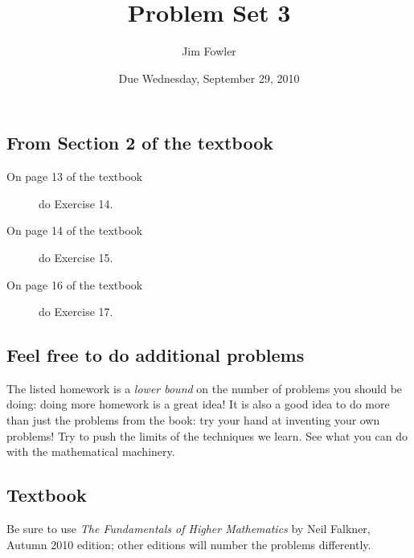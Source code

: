 \documentclass[12pt]{handout}
\author{Jim Fowler}
\title{Problem Set 3}
\date{Due Wednesday, September 29, 2010}
\begin{document}
\maketitle










\subsection*{From Section 2 of the textbook}



\begin{description}

\item[On page 13 of the textbook] do Exercise 14.

\item[On page 14 of the textbook] do Exercise 15.

\item[On page 16 of the textbook] do Exercise 17.

\end{description}









\subsection*{Feel free to do additional problems}
The listed homework is a \textit{lower bound} on the number of
problems you should be doing: doing more homework is a great idea!  It
is also a good idea to do more than just the problems from the book:
try your hand at inventing your own problems!  Try to push the limits
of the techniques we learn.  See what you can do with the mathematical
machinery.



\subsection*{Textbook}
Be sure to use \textit{The Fundamentals of Higher Mathematics} by Neil Falkner, Autumn 2010 edition; other editions will number the problems differently.
\end{document}
